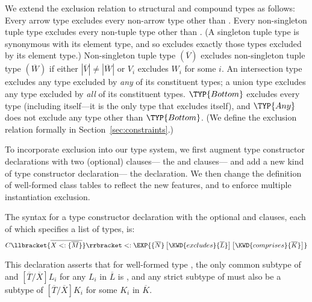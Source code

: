 \documentclass[10pt]{sigplanconf}
\renewcommand{\bar}{\overline}
\newcommand{\extends}{\ensuremath{<:}}
\newcommand{\ob}[1]{\ensuremath{\llbracket {#1} \rrbracket}}
\newcommand{\bd}[1]{\ensuremath{\{\bar{#1}\}}}
\newcommand{\substb}[2]{\ensuremath{[\bar{#1}/\bar{#2}]}}
\newcommand{\bds}[2]{\ensuremath{\bar{{#1} \extends \bd{#2}}}}
\newcommand{\tplist}[2]{\ensuremath{\ob{\bds{#1}{#2}}}}
\newcommand{\Any}{\TYP{Any}}
\newcommand{\Bottom}{\TYP{Bottom}}
\begin{document}
We extend the exclusion relation 
to structural and compound types as follows:
Every arrow type excludes every non-arrow type other than \Any.
Every non-singleton tuple type excludes every non-tuple type other than \Any.
(A singleton tuple type is synonymous with its element type, 
and so excludes exactly those types excluded by its element type.)
Non-singleton tuple type $(\bar{V})$ excludes non-singleton tuple type
$(\bar{W})$ if either $|\bar{V}| \neq |\bar{W}|$
or $V_i$ excludes $W_i$ for some $i$.
An intersection type excludes any type excluded by \emph{any} of its constituent types;
a union type excludes any type excluded by \emph{all} of its constituent types.
$\Bottom$ excludes every type 
(including itself---it is the only type that excludes itself), 
and $\Any$ does not exclude any type other than $\Bottom$.
(We define the exclusion relation formally in Section~\ref{sec:constraints}.)


To incorporate exclusion into our type system, 
we first augment type constructor declarations 
with two (optional) clauses---%
the  and  clauses---%
and add a new kind of type constructor declaration---%
the  declaration.
We then change the definition of well-formed class tables 
to reflect the new features, 
and to enforce multiple instantiation exclusion.

The syntax for a type constructor declaration
with the optional  and  clauses, 
each of which specifies a list of types,
is:
\[
C\tplist{X}{M} \extends \EXP{\lbrace\bar{N}\rbrace\, \bigl[\KWD{excludes} \lbrace\bar{L}\rbrace\bigr]\, \bigl[\KWD{comprises} \lbrace\bar{K}\rbrace\bigr]}
\]

This declaration asserts that for well-formed type \EXP{C\llbracket\bar{T}\rrbracket}, 
the only common subtype of \EXP{C\llbracket\bar{T}\rrbracket} 
and $\substb{T}{X}L_i$ for any $L_i$ in $\bar{L}$ 
is \Bottom, 
and any strict subtype of \EXP{C\llbracket\bar{T}\rrbracket} 
must also be a subtype of $\substb{T}{X}K_i$ for some $K_i$ in $\bar{K}$.

\end{document}
